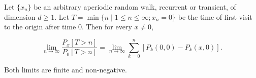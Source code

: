 Let $\{x_n\}$ be an arbitrary aperiodic random walk, recurrent or transient, of dimension $d \geq 1$. Let $T = \min\{n \mid 1 \leq n \leq \infty; x_n = 0\}$ be the time of first visit to the origin after time $0$. Then for every $x \neq 0$,

$$\lim_{n \to \infty} \frac{P_x[T > n]}{P_0[T > n]} = \lim_{n \to \infty} \sum_{k=0}^{n} \left[P_k(0,0) - P_k(x,0)\right].$$

Both limits are finite and non-negative.
